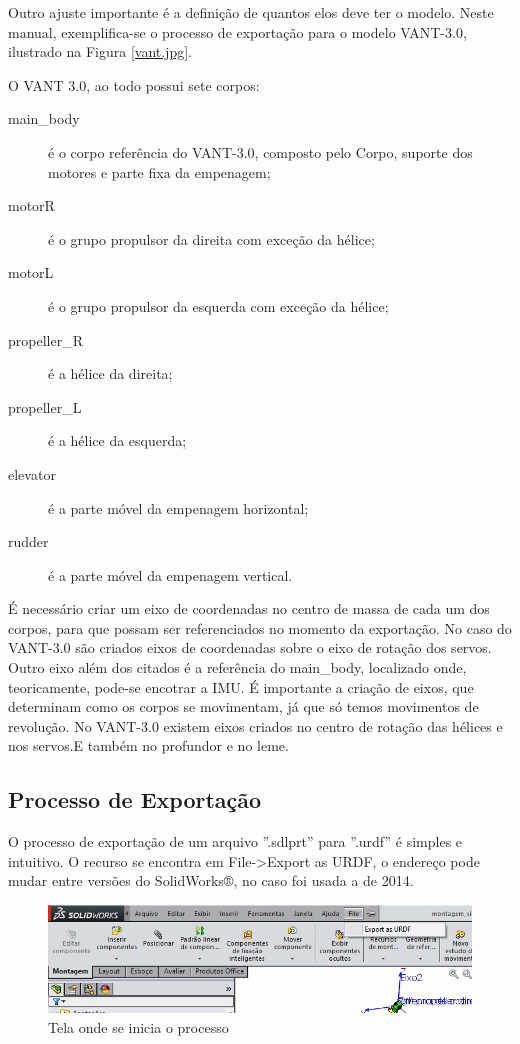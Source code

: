 Outro ajuste importante é a definição de quantos elos deve ter o modelo. Neste manual, exemplifica-se o processo de exportação para o modelo VANT-3.0, ilustrado na Figura \ref{vant.jpg}.

O VANT 3.0, ao todo possui sete corpos:


\begin{description}
\item [main\_body] é o corpo referência do VANT-3.0, composto pelo Corpo, suporte dos motores e parte fixa da empenagem;
\item [motorR] é o grupo propulsor da direita com exceção da hélice; 
\item [motorL] é o grupo propulsor da esquerda com exceção da hélice; 
\item [propeller\_R] é a hélice da direita;
\item [propeller\_L] é a hélice da esquerda;
\item [elevator] é a parte móvel da empenagem horizontal;
\item [rudder] é a parte móvel da empenagem vertical.
\end{description}

É necessário criar um eixo de coordenadas no centro de massa de cada um dos corpos, para que possam ser referenciados no momento da exportação. No caso do VANT-3.0 são criados eixos de coordenadas sobre o eixo de rotação dos servos. Outro eixo além dos citados é a referência do main\_body, localizado onde, teoricamente, pode-se encotrar a IMU. É importante a criação de eixos, que determinam como os corpos se movimentam, já que só temos movimentos de revolução. No VANT-3.0 existem eixos criados no centro de rotação das hélices e nos servos.E também no profundor e no leme.

\subsection{Processo de Exportação}

O processo de exportação de um arquivo ''.sdlprt'' para ''.urdf'' é simples e intuitivo. O recurso se encontra em File->Export as URDF, o endereço pode mudar entre versões do SolidWorks®, no caso foi usada a de 2014.

\begin{figure}[!htb]%
\centering %
\includegraphics[scale=0.75]{Imagens/ExportasURDF.jpg} %
\caption{Tela onde se inicia o processo} %
\end{figure} %


